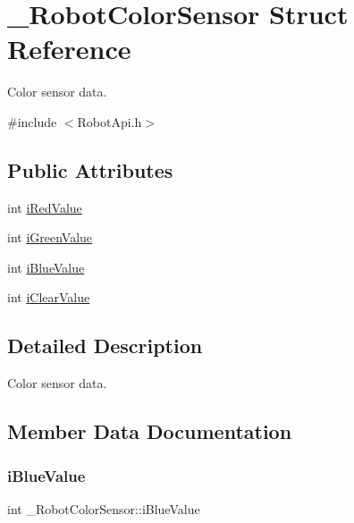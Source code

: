 \hypertarget{struct__RobotColorSensor}{}\section{\+\_\+\+Robot\+Color\+Sensor Struct Reference}
\label{struct__RobotColorSensor}


Color sensor data.  




{\ttfamily \#include $<$Robot\+Api.\+h$>$}

\subsection*{Public Attributes}
\begin{DoxyCompactItemize}
\item 
int \hyperlink{struct__RobotColorSensor_a38b270be1ee87849b7469d100e335314}{i\+Red\+Value}
\item 
int \hyperlink{struct__RobotColorSensor_acfeb66d972f8c3ab2a5982fd4aa3f630}{i\+Green\+Value}
\item 
int \hyperlink{struct__RobotColorSensor_ad5c72e4e33a2447d6514d1d5a13dc036}{i\+Blue\+Value}
\item 
int \hyperlink{struct__RobotColorSensor_afc18a2ae43409d1b74340f6f9d9fb677}{i\+Clear\+Value}
\end{DoxyCompactItemize}


\subsection{Detailed Description}
Color sensor data. 

\subsection{Member Data Documentation}
\mbox{\label{struct__RobotColorSensor_ad5c72e4e33a2447d6514d1d5a13dc036}} 
\subsubsection{\texorpdfstring{i\+Blue\+Value}{iBlueValue}}
{\footnotesize\ttfamily int \+\_\+\+Robot\+Color\+Sensor\+::i\+Blue\+Value}

